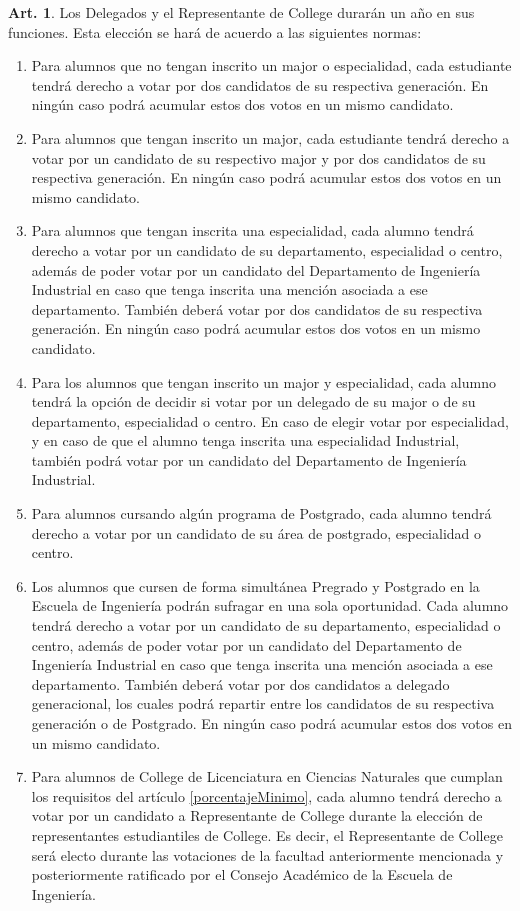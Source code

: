 \documentclass[letterpaper,11pt]{article}
\theoremstyle{definition}%
\newtheorem{art}{Art.} %
\begin{document}
\begin{art}\label{definicionesDelegados}
	Los Delegados y el Representante de College durarán un año en sus funciones. Esta elección se hará de acuerdo a las siguientes normas:
	\begin{enumerate}
		\item Para alumnos que no tengan inscrito un major o especialidad, cada estudiante tendrá derecho a votar por dos candidatos de su respectiva generación. En ningún caso podrá acumular estos dos votos en un mismo candidato.
		\item Para alumnos que tengan inscrito un major, cada estudiante tendrá derecho a votar por un candidato de su respectivo major y por dos candidatos de su respectiva generación. En ningún caso podrá acumular estos dos votos en un mismo candidato.
		\item Para alumnos que tengan inscrita una especialidad, cada alumno tendrá derecho a votar por un candidato de su departamento, especialidad o centro, además de poder votar por un candidato del Departamento de Ingeniería Industrial en caso que tenga inscrita una mención asociada a ese departamento. También deberá votar por dos candidatos de su respectiva generación. En ningún caso podrá acumular estos dos votos en un mismo candidato.
		\item Para los alumnos que tengan inscrito un major y especialidad, cada alumno tendrá la opción de decidir si votar por un delegado de su major o de su departamento, especialidad o centro. En caso de elegir votar por especialidad, y en caso de que el alumno tenga inscrita una especialidad Industrial, también podrá votar por un candidato del Departamento de Ingeniería Industrial.
		\item Para alumnos cursando algún programa de Postgrado, cada alumno tendrá derecho a votar por un candidato de su área de postgrado, especialidad o centro.
		\item Los alumnos que cursen de forma simultánea Pregrado y Postgrado en la Escuela de Ingeniería podrán sufragar en una sola oportunidad. Cada alumno tendrá derecho a votar por un candidato de su departamento, especialidad o centro, además de poder votar por un candidato del Departamento de Ingeniería Industrial en caso que tenga inscrita una mención asociada a ese departamento. También deberá votar por dos candidatos a delegado generacional, los cuales podrá repartir entre los candidatos de su respectiva generación o de Postgrado. En ningún caso podrá acumular estos dos votos en un mismo candidato.
		\item Para alumnos de College de Licenciatura en Ciencias Naturales que cumplan los requisitos del artículo \ref{porcentajeMinimo}, cada alumno tendrá derecho a votar por un candidato a Representante de College durante la elección de representantes estudiantiles de College. Es decir, el Representante de College será electo durante las votaciones de la facultad anteriormente mencionada y posteriormente ratificado por el Consejo Académico de la Escuela de Ingeniería.

\end{enumerate}
\end{art}
\end{document}
